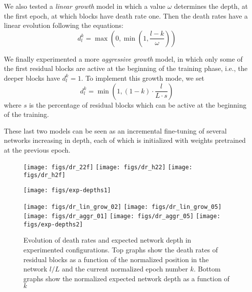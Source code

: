 \documentclass{sig-alternate}
\begin{document}
We also tested a \emph{linear growth} model in which a value $\omega$ determines the depth, at the first epoch, at which blocks have death rate one.
Then the death rates have a linear evolution following the equations:
\begin{equation}  \label{eq:aggr-lgrow}
d_l^k = \max\left (0,\min \left ( 1, \frac{l-k}{\omega} \right )\right)
\end{equation}


We finally experimented a more \emph{aggressive growth} model, in which only some of the first residual blocks are active at the beginning of the training phase, i.e., the deeper blocks have $d_l^k=1$.
To implement this growth mode, we set
\begin{equation} \label{eq:aggr-grow}
d_l^k = \min \left ( 1, (1-k) \cdot \frac{l}{L \cdot s} \right )
\end{equation}
where $s$ is the percentage of residual blocks which can be active at the beginning of the training.

These last two models can be seen as an incremental fine-tuning of several networks increasing in depth, each of which is initialized with weights pretrained at the previous epoch. 

\begin{figure*}
	\begin{minipage}[t]{.5\linewidth}
		\texttt{[image: figs/dr\_22f]}
  		\texttt{[image: figs/dr\_h22]}
        \texttt{[image: figs/dr\_h2f]}
        \vspace{10em}
        
		\texttt{[image: figs/exp-depths1]}
	\end{minipage}
    \begin{minipage}[t]{.5\linewidth}
        \texttt{[image: figs/dr\_lin\_grow\_02]}
        \texttt{[image: figs/dr\_lin\_grow\_05]}
        \texttt{[image: figs/dr\_aggr\_01]}
        \texttt{[image: figs/dr\_aggr\_05]}
   		\texttt{[image: figs/exp-depths2]}
	\end{minipage}
    \label{fig:growth-modes}
	\caption{Evolution of death rates and expected network depth in experimented configurations.
    Top graphs show the death rates of residual blocks as a function of the normalized position in the network $l/L$ and the current normalized epoch number $k$. Bottom graphs show the normalized expected network depth as a function of $k$}
\end{figure*}
\end{document}
